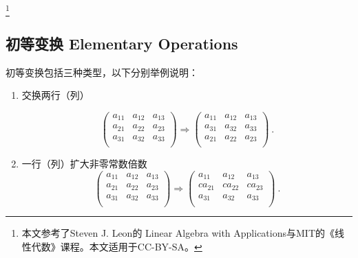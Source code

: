 
\begin{issues}
\issueMissDepend
\end{issues}

\footnote{本文参考了Steven J. Leon的 Linear Algebra with Applications与MIT的《线性代数》课程。本文适用于CC-BY-SA。}

\subsection{初等变换 Elementary Operations}
初等变换包括三种类型，以下分别举例说明：

\begin{enumerate}
\item 交换两行（列）

\begin{equation}
\begin{pmatrix}
        a_{11} & a_{12} & a_{13}\\
        a_{21} & a_{22} & a_{23}\\
        a_{31} & a_{32} & a_{33}\\
\end{pmatrix}
\Rightarrow
\begin{pmatrix}
        a_{11} & a_{12} & a_{13}\\
        a_{31} & a_{32} & a_{33}\\
        a_{21} & a_{22} & a_{23}\\
\end{pmatrix}~.
\end{equation}

\item 一行（列）扩大非零常数倍数
\begin{equation}
\begin{pmatrix}
        a_{11} & a_{12} & a_{13}\\
        a_{21} & a_{22} & a_{23}\\
        a_{31} & a_{32} & a_{33}\\
\end{pmatrix}
\Rightarrow
\begin{pmatrix}
        a_{11} & a_{12} & a_{13}\\
        ca_{21} & ca_{22} & ca_{23}\\
        a_{31} & a_{32} & a_{33}\\
\end{pmatrix}~.
\end{equation}


\end{enumerate}
